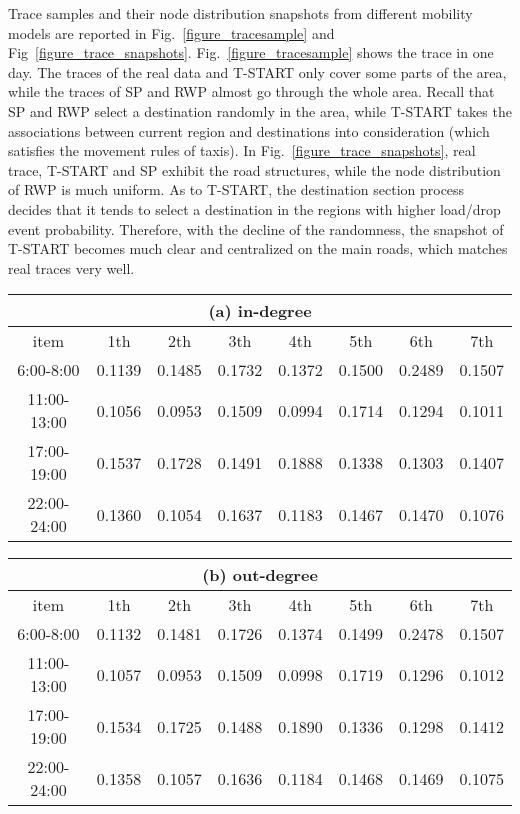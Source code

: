 Trace samples and their node distribution snapshots from different mobility models are reported in Fig.~\ref{figure_tracesample} and Fig~\ref{figure_trace_snapshots}. Fig.~\ref{figure_tracesample} shows the trace in one day. The traces of the real data and T-START only cover some parts of the area, while the traces of SP and RWP almost go through the whole area. Recall that SP and RWP select a destination randomly in the area, while T-START takes the associations between current region and destinations into consideration (which satisfies the movement rules of taxis). In Fig.~\ref{figure_trace_snapshots}, real trace, T-START and SP exhibit the road structures, while the node distribution of RWP is much uniform. As to T-START, the destination section process decides that it tends to select a destination in the regions with higher load/drop event probability. Therefore, with the decline of the randomness, the snapshot of T-START becomes much clear and centralized on the main roads, which matches real traces very well.
\begin{table*}[!t]
\centering
\caption{The relative error compared with the average for in-degree and out-degree}\label{table_relative_err_avg}
\begin{tabular}[c]{c|c|c|c|c|c|c|c}
\multicolumn{8}{c}{(a) in-degree}\\
\hline
item& 1th&2th&3th&4th&5th&6th&7th\\
\hline
6:00-8:00&
0.1139& 
0.1485&
0.1732&
0.1372&
0.1500&
0.2489&
0.1507\\
\hline
11:00-13:00&
0.1056&
0.0953&
0.1509&
0.0994&
0.1714&
0.1294&
0.1011\\
\hline
17:00-19:00&
0.1537&
0.1728&
0.1491&
0.1888&
0.1338&
0.1303&
0.1407\\
\hline
22:00-24:00&
0.1360&
0.1054&
0.1637&
0.1183&
0.1467&
0.1470&
0.1076\\
\hline
\end{tabular}
\begin{tabular}[c]{c|c|c|c|c|c|c|c}
\multicolumn{8}{c}{(b) out-degree}\\
\hline
item& 1th&2th&3th&4th&5th&6th&7th\\
\hline
6:00-8:00&
0.1132&
0.1481&
0.1726&
0.1374&
0.1499&
0.2478&
0.1507\\
\hline
11:00-13:00&
0.1057&
0.0953&
0.1509&
0.0998&
0.1719&
0.1296&
0.1012\\
\hline
17:00-19:00&
0.1534&
0.1725&
0.1488&
0.1890&
0.1336&
0.1298&
0.1412\\
\hline
22:00-24:00&
0.1358&
0.1057&
0.1636&
0.1184&
0.1468&
0.1469&
0.1075\\
\hline
\end{tabular}
\end{table*}
